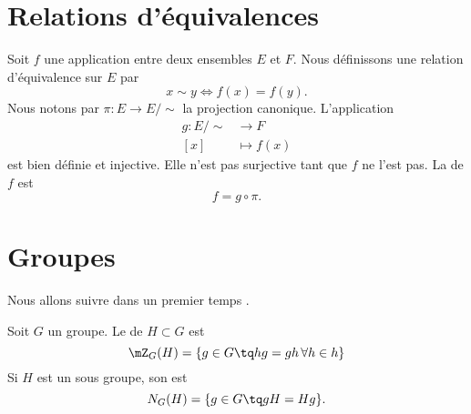 

\section{Relations d'équivalences}

Soit \( f\) une application entre deux ensembles \( E\) et \( F\). Nous définissons une relation d'équivalence sur \( E\) par
\begin{equation}
    x\sim y\Leftrightarrow f(x)=f(y).
\end{equation}
Nous notons par \( \pi\colon E\to E/\sim\) la projection canonique. L'application
\begin{equation}
    \begin{aligned}
        g\colon E/\sim&\to F \\
        [x]&\mapsto f(x) 
    \end{aligned}
\end{equation}
est bien définie et injective. Elle n'est pas surjective tant que \( f\) ne l'est pas. La  de \( f\) est 
\begin{equation}
    f=g\circ\pi.
\end{equation}

\section{Groupes}

Nous allons suivre dans un premier temps \cite{Kropholler}.

\begin{definition}
    Soit \( G\) un groupe. Le  de \( H\subset G\) est 
    \begin{equation}
        \mZ_G(H)=\{ g\in G\tq hg=gh\,\forall h\in h\}
    \end{equation}
    Si \( H\) est un sous groupe, son  est
    \begin{equation}
        N_G(H)=\{ g\in G\tq gH=Hg \}.
    \end{equation}
\end{definition}

